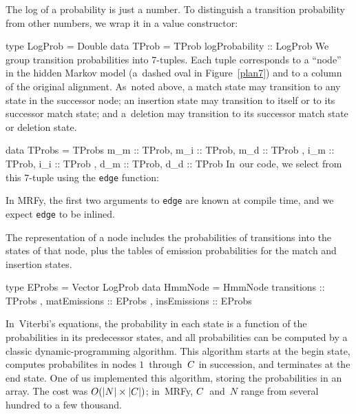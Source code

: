 \documentclass[preprint,nonatbib,blockstyle,nocopyrightspace,times]{sigplanconf}
\newcommand\alignwidth{\ensuremath C} %
\newcommand\figref[1]{Figure~\ref{#1}}
\newenvironment{smallverbatim}{\par\small\verbatim}{\endverbatim}
\newcommand\smallverbatiminput[1]{{\par\unskip\small}}
\begin{document}
The log of a probability is just a number.
To distinguish a transition probability from other numbers, we wrap it in
a value constructor:
\begin{smallverbatim}
type LogProb = Double
data TProb   = TProb { logProbability :: LogProb }
\end{smallverbatim}
We group transition probabilities into 7-tuples.
Each tuple corresponds to a ``node'' in the hidden Markov model
(a~dashed oval in \figref{plan7}) and to a column of the original
alignment.
As~noted above, 
a match state may transition to any state in the successor node;
an insertion state may transition to itself or to its successor match
state;
and
a~deletion may transition to its successor match
state or deletion state.
\begin{smallverbatim}
data TProbs = 
     TProbs { m_m :: TProb, m_i :: TProb, m_d :: TProb
            , i_m :: TProb, i_i :: TProb
            , d_m :: TProb, d_d :: TProb }
\end{smallverbatim}
In~our code, we select from this 7-tuple using the \texttt{edge}
function:
\smallverbatiminput{edge}
In MRFy, the first two arguments to \texttt{edge} are known at compile
time, and we expect \texttt{edge} to be inlined.

The representation of a node includes the probabilities of transitions
into the states of that node, plus the tables
of emission probabilities for the match and insertion states.
\begin{smallverbatim}
type EProbs  = Vector LogProb
data HmmNode = HmmNode { transitions  :: TProbs
                       , matEmissions :: EProbs
                       , insEmissions :: EProbs
                       }
\end{smallverbatim}

In~Viterbi's equations,
the probability in each state is a function of the probabilities
in its predecessor states, 
and all probabilities can be computed by a classic dynamic-programming
algorithm.
This algorithm starts at the begin state,
computes probabilites in nodes $1$~through~$\alignwidth$ in
succession, and terminates at the end state.
One of us implemented this algorithm, storing the probabilities in an array.
The cost was
$O(|N|\times|\alignwidth|)$;
in~MRFy, $\alignwidth$~and~$N$ range from several hundred to a few
thousand.



\end{document}

